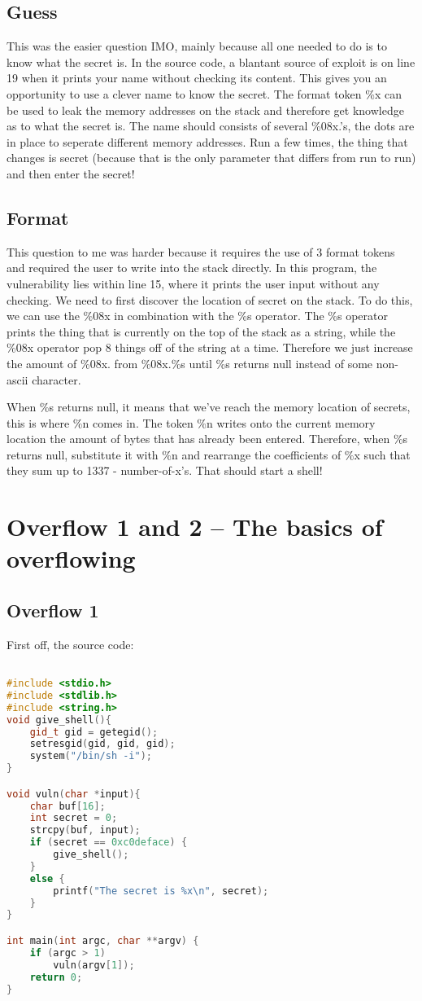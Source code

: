 \documentclass [12 pt, twoside] {article}
\begin{document}
\subsection{Guess}


This was the easier question IMO, mainly because all one needed to do is to know what the secret is.
In the source code, a blantant source of exploit is on line 19 when it prints your name
without checking its content. This gives you an opportunity to use a clever name to
know the secret. The format token \%x can be used to leak the memory addresses on the stack
and therefore get knowledge as to what the secret is. The name should consists of several
\%08x.'s, the dots are in place to seperate different memory addresses. Run a few times,
the thing that changes is secret (because that is the only parameter that differs from run to run)
and then enter the secret!


\subsection{Format}


This question to me was harder because it requires the use of 3 format tokens and
required the user to write into the stack directly. In this program, the vulnerability
lies within line 15, where it prints the user input without any checking. We need to first
discover the location of secret on the stack. To do this, we can use the \%08x in combination
with the \%s operator. The \%s operator prints  the thing that is currently on the top of the stack as a string,
while the \%08x operator pop 8 things off of the string at a time. Therefore we just
increase the amount of \%08x. from \%08x.\%s until \%s returns null instead of some
non-ascii character.


When \%s returns null, it means that we've reach the memory location of secrets, this
is where \%n comes in. The token \%n writes onto the current memory location the amount
of bytes that has already been entered. Therefore, when \%s returns null, substitute
it with \%n and rearrange the coefficients of \%x such that they sum up to 1337 - number-of-x's.
That should start a shell!
\section{Overflow 1 and 2 -- The basics of overflowing}
\subsection{Overflow 1}
First off, the source code:
\begin{lstlisting}[language=C++]

#include <stdio.h>
#include <stdlib.h>
#include <string.h>
void give_shell(){
	gid_t gid = getegid();
	setresgid(gid, gid, gid);
	system("/bin/sh -i");
}

void vuln(char *input){ 
	char buf[16];
	int secret = 0;
	strcpy(buf, input);
	if (secret == 0xc0deface) {
		give_shell();
	}
	else {
		printf("The secret is %x\n", secret);
	}
}

int main(int argc, char **argv) {
	if (argc > 1)
		vuln(argv[1]);
	return 0;
}
\end{lstlisting}
\end{document}
